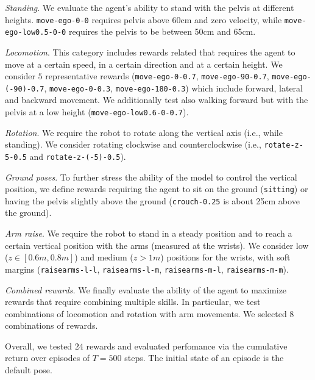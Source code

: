 \textit{Standing}. We evaluate the agent's ability to stand with the pelvis at different heights. \texttt{move-ego-0-0} requires pelvis above 60cm and zero velocity, while \texttt{move-ego-low0.5-0-0} requires the pelvis to be between 50cm and 65cm.

\textit{Locomotion}. This category includes rewards related that requires the agent to move at a certain speed, in a certain direction and at a certain height. We consider $5$ representative rewards (\texttt{move-ego-0-0.7}, \texttt{move-ego-90-0.7}, \texttt{move-ego-(-90)-0.7}, \texttt{move-ego-0-0.3}, \texttt{move-ego-180-0.3}) which include forward, lateral and backward movement. We additionally test also walking forward but with the pelvis at a low height (\texttt{move-ego-low0.6-0-0.7}).

\textit{Rotation}. We require the robot to rotate along the vertical axis (i.e., while standing). We consider rotating clockwise and counterclockwise (i.e., \texttt{rotate-z-5-0.5} and \texttt{rotate-z-(-5)-0.5}).

\textit{Ground poses}. To further stress the ability of the model to control the vertical position, we define rewards requiring the agent to sit on the ground (\texttt{sitting}) or having the pelvis slightly above the ground (\texttt{crouch-0.25} is about 25cm above the ground).

\textit{Arm raise}. We require the robot to stand in a steady position and to reach a certain vertical position with the arms (measured at the wrists). We consider low ($z \in [0.6m, 0.8m]$) and medium ($z > 1m$) positions for the wrists, with soft margins (\texttt{raisearms-l-l}, \texttt{raisearms-l-m}, \texttt{raisearms-m-l}, \texttt{raisearms-m-m}).


\textit{Combined rewards.} We finally evaluate the ability of the agent to maximize rewards that require combining multiple skills. In particular, we test combinations of locomotion and rotation with arm movements. We selected $8$ combinations of rewards.


Overall, we tested $24$ rewards and evaluated perfomance via the cumulative
return over episodes of $T = 500$ steps. The initial state of an episode is the default pose.